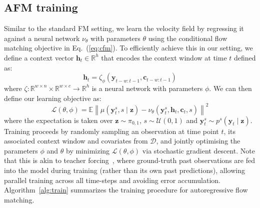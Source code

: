\documentclass[a4paper,10pt,twocolumn,preprint,3p]{elsarticle}
\begin{document}
\subsection{AFM training}
Similar to the standard FM setting, we learn the velocity field by regressing it against a neural network $\nu_\theta$ with parameters $\theta$ using the conditional flow matching objective in Eq.~(\ref{eq:cfm}). To efficiently achieve this in our setting, we define a context vector $\mathbf{h}_t \in \mathbb{R}^h$ that encodes the context window at time $t$ defined as:
\begin{equation}\label{eq:seq_model}
\mathbf{h}_t = \zeta_\phi(\mathbf{y}_{t-w:t-1}, \mathbf{c}_{t-w:t-1})
\end{equation} 
where $\zeta \colon \mathbb{R}^{w \times n} \times \mathbb{R}^{w \times c} \to  \mathbb{R}^h$ is a neural network with parameters $\phi$. We can then define our learning objective as: 
\begin{equation}\label{eqn:cfm}
\mathcal{L}(\theta, \phi) = \mathbb{E} \left\| \mu(\mathbf{y}_t^s, s \mid \mathbf{z}) - \nu_\theta(\mathbf{y}_t^s, \mathbf{h}_t, \mathbf{c}_t, s) \right\|^2 
\end{equation}
where the expectation is taken over $\mathbf{z} \sim \pi_{0,1}$, $s \sim \mathcal{U}(0,1)$ and $\mathbf{y}_t^s \sim p^s(\mathbf{y}_t\mid\mathbf{z})$. Training proceeds by randomly sampling an observation at time point $t$, its associated context window and covariates from $\mathcal{D}$, and jointly optimising the parameters $\phi$ and $\theta$ by minimizing $\mathcal{L}(\theta, \phi)$ via stochastic gradient descent. 
Note that this is akin to teacher forcing~\citep{williams1989learning}, where ground-truth past observations are fed into the model during training (rather than its own past predictions), allowing parallel training across all time-steps and avoiding error accumulation. Algorithm~\ref{alg:train} summarizes the training procedure for autoregressive flow matching. 
\end{document}
